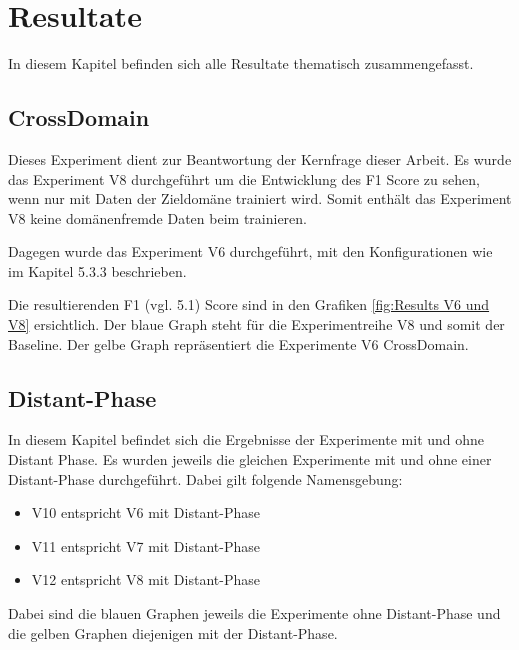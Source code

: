 \chapter{Resultate}
In diesem Kapitel befinden sich alle Resultate thematisch zusammengefasst.
\section{CrossDomain}
Dieses Experiment dient zur Beantwortung der Kernfrage dieser Arbeit. Es wurde das Experiment V8 durchgeführt um die Entwicklung des F1 Score zu sehen, wenn nur mit Daten der Zieldomäne trainiert wird. Somit enthält das Experiment V8 keine domänenfremde Daten beim trainieren.

Dagegen wurde das Experiment V6 durchgeführt, mit den Konfigurationen wie im Kapitel 5.3.3 beschrieben.

Die resultierenden F1 (vgl. 5.1) Score sind in den Grafiken \ref{fig:Results V6 und V8} ersichtlich. Der blaue Graph steht für die Experimentreihe V8 und somit der Baseline. Der gelbe Graph repräsentiert die Experimente V6 CrossDomain.


\section{Distant-Phase}
In diesem Kapitel befindet sich die Ergebnisse der Experimente mit und ohne Distant Phase. Es wurden jeweils die gleichen Experimente mit und ohne einer Distant-Phase durchgeführt. Dabei gilt folgende Namensgebung:
\begin{itemize}  
	\item V10 entspricht V6 mit Distant-Phase
	\item V11 entspricht V7 mit Distant-Phase
	\item V12 entspricht V8 mit Distant-Phase
\end{itemize}
Dabei sind die blauen Graphen jeweils die Experimente ohne Distant-Phase und die gelben Graphen diejenigen mit der Distant-Phase.

